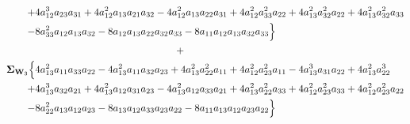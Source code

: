 \documentclass{article}
\begin{document}
\begin{equation}
\begin{aligned}
+& 4 a_{12}^{3} a_{23} a_{31} + 4 a_{12}^{2} a_{13} a_{21} a_{32} - 4 a_{12}^{2} a_{13} a_{22} a_{31} + 4 a_{12}^{2} a_{33}^{2} a_{22} + 4 a_{13}^{2} a_{32}^{2} a_{22} + 4 a_{13}^{2} a_{32}^{2} a_{33} \\
-& 8 a_{33}^{2} a_{12} a_{13} a_{32} - 8 a_{12} a_{13} a_{22} a_{32} a_{33} - 8 a_{11} a_{12} a_{13} a_{32} a_{33}\Bigr\} \\
& \qquad \qquad \qquad \qquad \qquad \qquad \qquad + \\
\mathbf{\Sigma}_{\textbf{W}_{3}} \Bigl\{&4 a_{13}^{2} a_{11} a_{33} a_{22} - 4 a_{13}^{2} a_{11} a_{32} a_{23} + 4 a_{13}^{2} a_{22}^{2} a_{11} + 4 a_{12}^{2} a_{23}^{2} a_{11} - 4 a_{13}^{3} a_{31} a_{22} + 4 a_{13}^{2} a_{22}^{3} \\
+& 4 a_{13}^{3} a_{32} a_{21} + 4 a_{13}^{2} a_{12} a_{31} a_{23} - 4 a_{13}^{2} a_{12} a_{33} a_{21} + 4 a_{13}^{2} a_{22}^{2} a_{33} + 4 a_{12}^{2} a_{23}^{2} a_{33} + 4 a_{12}^{2} a_{23}^{2} a_{22} \\
-& 8 a_{22}^{2} a_{13} a_{12} a_{23} - 8 a_{13} a_{12} a_{33} a_{23} a_{22} - 8 a_{11} a_{13} a_{12} a_{23} a_{22}\Bigr\}
\end{aligned}
\label{eq:network3by3_sigma11}
\end{equation}
\end{document}
